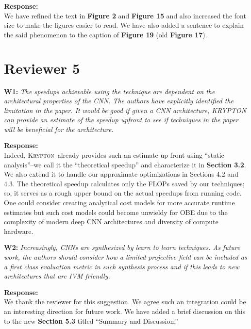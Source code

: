 \documentclass[preprint]{vldb}
\newcommand{\system}{\textsc{Krypton}}
\begin{document}
\vspace{2mm}
\noindent \textbf{Response:}\\
We have refined the text in \textbf{Figure 2} and \textbf{Figure 15} and also increased the font size to make the figures easier to read. We have also added a sentence to explain the said phenomenon to the caption of \textbf{Figure 19} (old \textbf{Figure 17}).


\section{Reviewer 5}

\vspace{2mm}
\noindent \textbf{W1:} \textit{ The speedups achievable using the technique are dependent on the architectural properties of the CNN. The authors have explicitly identified the limitation in the paper. It would be good if given a CNN architecture, KRYPTON can provide an estimate of the speedup upfront to see if techniques in the paper will be beneficial for the architecture.}

\vspace{2mm}
\noindent \textbf{Response:}\\
Indeed, \system ~already provides such an estimate up front using ``static analysis''--we call it the ``theoretical speedup'' and characterize it in \textbf{Section 3.2}. We also extend it to handle our approximate optimizations in Sections 4.2 and 4.3. The theoretical speedup calculates only the FLOPs saved by our techniques; so, it serves as a rough upper bound on the actual speedups from running code. One could consider creating analytical cost models for more accurate runtime estimates but such cost models could become unwieldy for OBE due to the complexity of modern deep CNN architectures and diversity of compute hardware.


\vspace{2mm}
\noindent \textbf{W2:} \textit{ Increasingly, CNNs are synthesized by learn to learn techniques. As future work, the authors should consider how a limited projective field can be included as a first class evaluation metric in such synthesis process and if this leads to new architectures that are IVM friendly.}

\vspace{2mm}
\noindent \textbf{Response:}\\
We thank the reviewer for this suggestion. We agree such an integration could be an interesting direction for future work. We have added a brief discussion on this to the new \textbf{Section 5.3} titled ``Summary and Discussion.''
\end{document}
